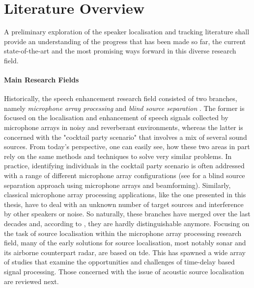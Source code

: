 \section{Literature Overview}

A preliminary exploration of the speaker localisation and tracking literature shall provide an understanding of the progress that has been made so far, the current state-of-the-art and the most promising ways forward in this diverse research field.
\paragraph{Main Research Fields}
Historically, the speech enhancement research field consisted of two branches, namely \textit{microphone array processing} and \textit{blind source separation} \cite[p.~693]{Gannot2017}. The former is focused on the localisation and enhancement of speech signals collected by microphone arrays in noisy and reverberant environments, whereas the latter is concerned with the "cocktail party scenario" that involves a mix of several sound sources. From today's perspective, one can easily see, how these two areas in part rely on the same methods and techniques to solve very similar problems. In practice, identifying individuals in the cocktail party scenario is often addressed with a range of different microphone array configurations (see \cite{Wang2013} for a blind source separation approach using microphone arrays and beamforming). Similarly, classical microphone array processing applications, like the one presented in this thesis, have to deal with an unknown number of target sources and interference by other speakers or noise. So naturally, these branches have merged over the last decades and, according to \cite[p.~693]{Gannot2017}, they are hardly distinguishable anymore. Focusing on the task of source localisation within the microphone array processing research field, many of the early solutions for source localisation, most notably sonar \cite{Hackmann1986} and its airborne counterpart radar, are based on \gls{tde}. This has spawned a wide array of studies that examine the opportunities and challenges of time-delay based signal processing. Those concerned with the issue of acoustic source localisation are reviewed next.

